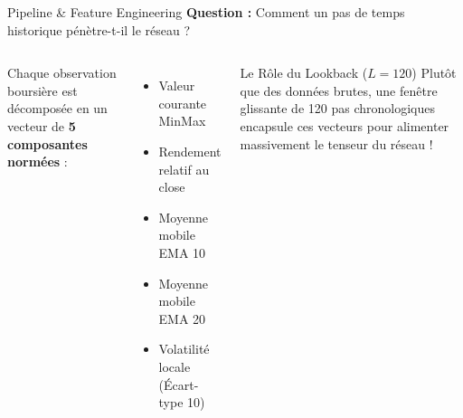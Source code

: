 \documentclass[10pt, aspectratio=169]{beamer}
\begin{document}
\begin{frame}{Pipeline \& Feature Engineering}
    \textbf{Question :} Comment un pas de temps historique pénètre-t-il le réseau ?

    \vspace{0.5cm}
    \begin{columns}
        Chaque observation boursière est décomposée en un vecteur de \textbf{5 composantes normées} :
        \begin{itemize}
            \item Valeur courante MinMax
            \item Rendement relatif au close
            \item Moyenne mobile EMA 10
            \item Moyenne mobile EMA 20
            \item Volatilité locale (Écart-type 10)
        \end{itemize}

        \begin{block}{Le Rôle du Lookback ($L=120$)}
            Plutôt que des données brutes, une fenêtre glissante de 120 pas chronologiques encapsule ces vecteurs pour alimenter massivement le tenseur du réseau !
        \end{block}
    \end{columns}
\end{frame}
\end{document}
